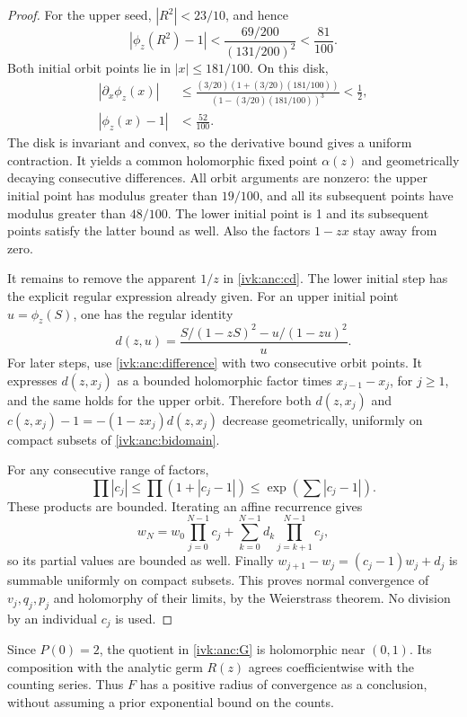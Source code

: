 \documentclass[11pt,letterpaper]{article}
\theoremstyle{remark}\newtheorem{remark}[theorem]{Remark}
\newcommand{\ph}{\phi_z}
\begin{document}
\begin{proof}
For the upper seed, $|R^2|<23/10$, and hence
\[
 |\ph(R^2)-1|
 <\frac{69/200}{(131/200)^2}<\frac{81}{100}.
\]
Both initial orbit points lie in $|x|\le181/100$. On this disk,
\begin{align}
 |\partial_x\ph(x)|
 &\le\frac{(3/20)(1+(3/20)(181/100))}
 {(1-(3/20)(181/100))^3}<\frac12,\label{ivk:anc:contraction}\\
 |\ph(x)-1|&<\frac{52}{100}.\label{ivk:anc:invariance}
\end{align}
The disk is invariant and convex, so the derivative bound gives a
uniform contraction. It yields a common holomorphic fixed point
$\alpha(z)$ and geometrically decaying consecutive differences.
All orbit arguments are nonzero: the upper initial point has
modulus greater than $19/100$, and all its subsequent points have
modulus greater than $48/100$. The lower initial point is 1 and
its subsequent points satisfy the latter bound as well. Also the
factors $1-zx$ stay away from zero.

It remains to remove the apparent $1/z$ in \eqref{ivk:anc:cd}. The lower
initial step has the explicit regular expression already given.
For an upper initial point $u=\ph(S)$, one has the regular identity
\begin{equation}\label{ivk:anc:removable}
 d(z,u)=\frac{S/(1-zS)^2-u/(1-zu)^2}{u}.
\end{equation}
For later steps, use \eqref{ivk:anc:difference} with two consecutive orbit
points. It expresses $d(z,x_j)$ as a bounded holomorphic factor
times $x_{j-1}-x_j$, for $j\ge1$, and the same holds for the upper
orbit. Therefore both $d(z,x_j)$ and
$c(z,x_j)-1=-(1-zx_j)d(z,x_j)$ decrease geometrically, uniformly
on compact subsets of \eqref{ivk:anc:bidomain}.

For any consecutive range of factors,
\[
 \prod |c_j|\le\prod(1+|c_j-1|)
                    \le\exp\left(\sum|c_j-1|\right).
\]
These products are bounded. Iterating an affine recurrence gives
\[
 w_N=w_0\prod_{j=0}^{N-1}c_j+
             \sum_{k=0}^{N-1}d_k\prod_{j=k+1}^{N-1}c_j,
\]
so its partial values are bounded as well. Finally
$w_{j+1}-w_j=(c_j-1)w_j+d_j$ is summable uniformly on compact
subsets. This proves normal convergence of $v_j,q_j,p_j$ and
holomorphy of their limits, by the Weierstrass theorem.
No division by an individual $c_j$ is used.
\end{proof}

Since $P(0)=2$, the quotient in \eqref{ivk:anc:G} is holomorphic near
$(0,1)$. Its composition with the analytic germ $R(z)$ agrees
coefficientwise with the counting series. Thus $F$ has a positive
radius of convergence as a conclusion, without assuming a prior
exponential bound on the counts.
\end{document}
